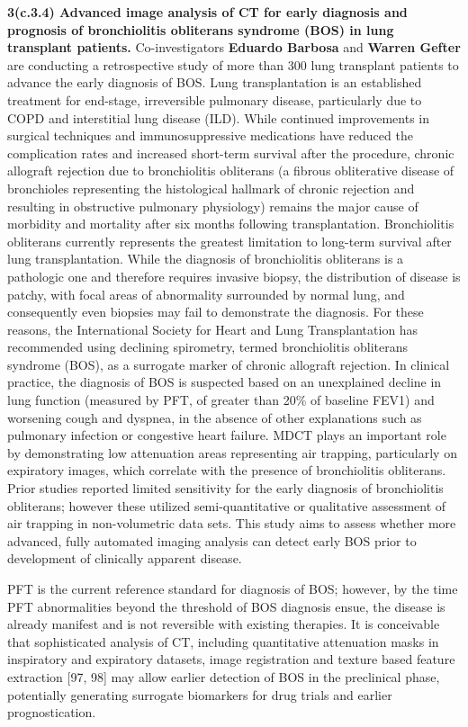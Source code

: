 \documentclass[11pt,]{article}
\begin{document}
\textbf{3(c.3.4) Advanced image analysis of CT for early diagnosis and
prognosis of bronchiolitis obliterans syndrome (BOS) in lung transplant
patients.} Co-investigators \textbf{Eduardo Barbosa} and \textbf{Warren
Gefter} are conducting a retrospective study of more than 300 lung
transplant patients to advance the early diagnosis of BOS. Lung
transplantation is an established treatment for end-stage, irreversible
pulmonary disease, particularly due to COPD and interstitial lung
disease (ILD). While continued improvements in surgical techniques and
immunosuppressive medications have reduced the complication rates and
increased short-term survival after the procedure, chronic allograft
rejection due to bronchiolitis obliterans (a fibrous obliterative
disease of bronchioles representing the histological hallmark of chronic
rejection and resulting in obstructive pulmonary physiology) remains the
major cause of morbidity and mortality after six months following
transplantation. Bronchiolitis obliterans currently represents the
greatest limitation to long-term survival after lung transplantation.
While the diagnosis of bronchiolitis obliterans is a pathologic one and
therefore requires invasive biopsy, the distribution of disease is
patchy, with focal areas of abnormality surrounded by normal lung, and
consequently even biopsies may fail to demonstrate the diagnosis. For
these reasons, the International Society for Heart and Lung
Transplantation has recommended using declining spirometry, termed
bronchiolitis obliterans syndrome (BOS), as a surrogate marker of
chronic allograft rejection. In clinical practice, the diagnosis of BOS
is suspected based on an unexplained decline in lung function (measured
by PFT, of greater than 20\% of baseline FEV1) and worsening cough and
dyspnea, in the absence of other explanations such as pulmonary
infection or congestive heart failure. MDCT plays an important role by
demonstrating low attenuation areas representing air trapping,
particularly on expiratory images, which correlate with the presence of
bronchiolitis obliterans. Prior studies reported limited sensitivity for
the early diagnosis of bronchiolitis obliterans; however these utilized
semi-quantitative or qualitative assessment of air trapping in
non-volumetric data sets. This study aims to assess whether more
advanced, fully automated imaging analysis can detect early BOS prior to
development of clinically apparent disease.

PFT is the current reference standard for diagnosis of BOS; however, by
the time PFT abnormalities beyond the threshold of BOS diagnosis ensue,
the disease is already manifest and is not reversible with existing
therapies. It is conceivable that sophisticated analysis of CT,
including quantitative attenuation masks in inspiratory and expiratory
datasets, image registration and texture based feature extraction {[}97,
98{]} may allow earlier detection of BOS in the preclinical phase,
potentially generating surrogate biomarkers for drug trials and earlier
prognostication.
\end{document}
